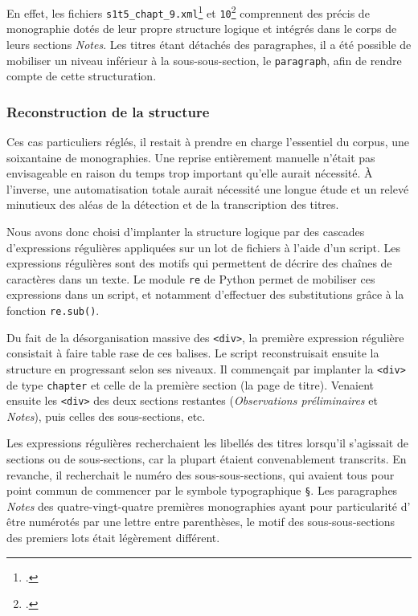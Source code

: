 En effet, les fichiers \texttt{s1t5\_chapt\_9.xml}\footcite{mono041a} et \texttt{10}\footcite{mono042a} comprennent des précis de monographie dotés de leur propre structure logique et intégrés dans le corps de leurs sections \textit{Notes}. Les titres étant détachés des paragraphes, il a été possible de mobiliser un niveau inférieur à la sous-sous-section, le \texttt{paragraph}, afin de rendre compte de cette structuration.

\subsubsection{Reconstruction de la structure}

Ces cas particuliers réglés, il restait à prendre en charge l'essentiel du corpus, \cad{} une soixantaine de monographies. Une reprise entièrement manuelle n'était pas envisageable en raison du temps trop important qu'elle aurait nécessité. À l'inverse, une automatisation totale aurait nécessité une longue étude et un relevé minutieux des aléas de la détection et de la transcription des titres.

Nous avons donc choisi d'implanter la structure logique par des cascades d'expressions régulières appliquées sur un lot de fichiers à l'aide d'un script. Les expressions régulières sont des motifs qui permettent de décrire des chaînes de caractères dans un texte. Le module \texttt{re} de Python permet de mobiliser ces expressions dans un script, et notamment d'effectuer des substitutions grâce à la fonction \texttt{re.sub()}.

Du fait de la désorganisation massive des \texttt{<div>}, la première expression régulière consistait à faire table rase de ces balises. Le script reconstruisait ensuite la structure en progressant selon ses niveaux. Il commençait par implanter la \texttt{<div>} de type \texttt{chapter} et celle de la première section (la page de titre). Venaient ensuite les \texttt{<div>} des deux sections restantes (\textit{Observations préliminaires} et \textit{Notes}), puis celles des sous-sections, etc.

Les expressions régulières recherchaient les libellés des titres lorsqu'il s'agissait de sections ou de sous-sections, car la plupart étaient convenablement transcrits. En revanche, il recherchait le numéro des sous-sous-sections, qui avaient tous pour point commun de commencer par le symbole typographique \texttt{§}. Les paragraphes \textit{Notes} des quatre-vingt-quatre premières monographies ayant pour particularité d'
être numérotés par une lettre entre parenthèses, le motif des sous-sous-sections des premiers lots était légèrement différent.

